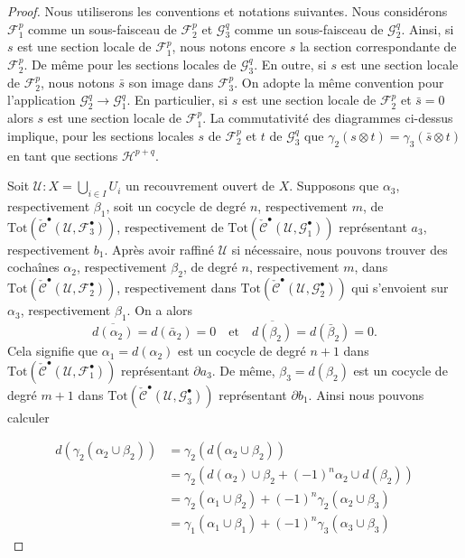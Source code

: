 {\begin{proof}
Nous utiliserons les conventions et notations suivantes. Nous considérons
${\mathcal F}_1^p$ comme un sous-faisceau de ${\mathcal F}_2^p$ et
${\mathcal G}_3^q$ comme un sous-faisceau de ${\mathcal G}_2^q$. Ainsi, si $s$ est une section locale de ${\mathcal F}_1^p$, nous notons encore $s$ la section correspondante de ${\mathcal F}_2^p$. De même pour les sections locales de ${\mathcal G}_3^q$. En outre, si $s$ est une section locale de ${\mathcal F}_2^p$, nous notons
$\bar s$ son image dans ${\mathcal F}_3^p$. On adopte la même convention pour l'application ${\mathcal G}_2^q \to {\mathcal G}^q_1$. En particulier, si
$s$ est une section locale de ${\mathcal F}_2^p$ et $\bar s = 0$
alors $s$ est une section locale de ${\mathcal F}_1^p$. La commutativité des diagrammes ci-dessus implique, pour les sections locales $s$ de
${\mathcal F}_2^p$ et $t$ de ${\mathcal G}_3^q$ que
$\gamma_2(s \otimes t) = \gamma_3(\bar s \otimes t)$ en tant que sections
${\mathcal H}^{p + q}$.

\medskip\noindent

Soit ${\mathcal U} : X =  \bigcup_{i \in I} U_i$ un recouvrement ouvert de $X$. Supposons que $\alpha_3$, respectivement $\beta_1$, soit un cocycle de degré $n$, respectivement $m$, de
$\text{Tot}(
\check{\mathcal{C}}^\bullet({\mathcal U}, {\mathcal F}_3^\bullet))$, respectivement de $\text{Tot}(
\check{\mathcal{C}}^\bullet({\mathcal U}, {\mathcal G}_1^\bullet))$
représentant $a_3$, respectivement $b_1$. Après avoir raffiné $\mathcal{U}$ si nécessaire, nous pouvons trouver des cochaînes $\alpha_2$, respectivement $\beta_2$, de degré $n$, respectivement $m$, dans
$\text{Tot}(
\check{\mathcal{C}}^\bullet({\mathcal U}, {\mathcal F}_2^\bullet))$, respectivement dans $\text{Tot}(
\check{\mathcal{C}}^\bullet({\mathcal U}, {\mathcal G}_2^\bullet))$
qui s'envoient sur $\alpha_3$, respectivement $\beta_1$. On a alors
$$
\overline{d(\alpha_2)} = d(\bar \alpha_2) = 0
\quad\text{et}\quad
\overline{d(\beta_2)} = d(\bar \beta_2) = 0.
$$
Cela signifie que $\alpha_1 = d(\alpha_2)$ est un cocycle de degré $n + 1$ dans
$\text{Tot}(\check{\mathcal{C}}^\bullet({\mathcal U}, {\mathcal F}_1^\bullet))$
représentant $\partial a_3$. De même, $\beta_3 = d(\beta_2)$ est un cocycle de degré $m + 1$ dans
$\text{Tot}(\check{\mathcal{C}}^\bullet({\mathcal U}, {\mathcal G}_3^\bullet))$
représentant $\partial b_1$. Ainsi nous pouvons calculer

\begin{align*}
d(\gamma_2(\alpha_2 \cup \beta_2))
& =
\gamma_2(d(\alpha_2 \cup \beta_2))
\\
& =
\gamma_2(d(\alpha_2) \cup \beta_2 + (-1)^n \alpha_2 \cup d(\beta_2) )
\\
& =
\gamma_2( \alpha_1 \cup \beta_2)  + (-1)^n \gamma_2( \alpha_2 \cup \beta_3)
\\
& =
\gamma_1(\alpha_1 \cup \beta_1) + (-1)^n \gamma_3(\alpha_3 \cup \beta_3)
\end{align*}


\end{proof}}
